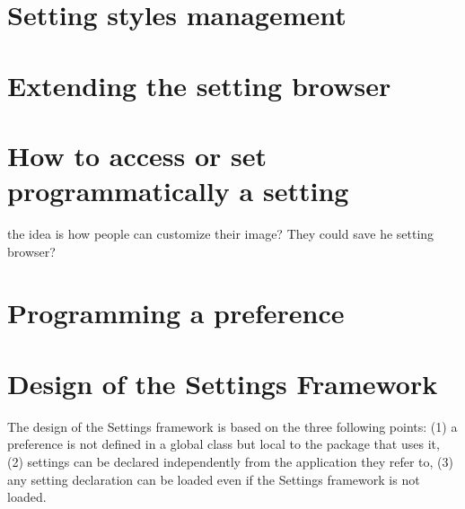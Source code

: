 \documentclass[a4paper,10pt,twoside]{book}
\begin{document}
%
%					
%


\section{Setting styles management}
\label{sec:SettingStylesManagement}

\section{Extending the setting browser}
\label{sec:ExtendingTheSettingsBrowser}

\section{How to access or set programmatically a setting}
the idea is how people can customize their image?
They could save he setting browser?


\section{Programming a preference}
\label{sec:ProgrammingAPreference}



\section{Design of the Settings Framework}
The design of the Settings framework is based on the three following points: (1) a preference is not defined in a global class but local to the package that uses it, (2) settings can be declared independently from the application they refer to, (3) any setting declaration can be loaded even if the Settings framework is not loaded. 
\end{document}
